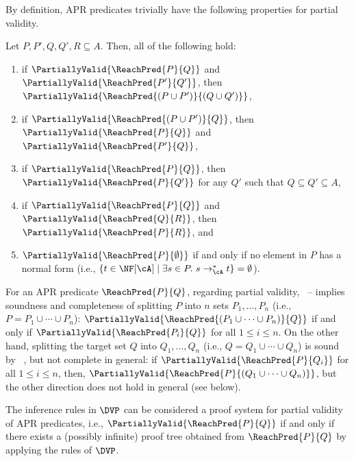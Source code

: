 By definition, APR predicates trivially have the following properties for partial validity.
\begin{proposition}
	\label{prop:basic-properties-of-partially-valid-APR-problems}
	Let $P,P',Q,Q',R \subseteq A$.
	Then, all of the following hold:
	\begin{enumerate}
		\renewcommand{\labelenumi}{(\arabic{enumi})}
		\leftskip=1ex
		\item if
		      $\PartiallyValid{\ReachPred{P}{Q}}$ and $\PartiallyValid{\ReachPred{P'}{Q'}}$,
		      then
		      $\PartiallyValid{\ReachPred{(P\cup P')}{(Q\cup Q')}}$,
		\item if
		      $\PartiallyValid{\ReachPred{(P\cup P')}{Q}}$,
		      then
		      $\PartiallyValid{\ReachPred{P}{Q}}$ and $\PartiallyValid{\ReachPred{P'}{Q}}$,
		\item if
		      $\PartiallyValid{\ReachPred{P}{Q}}$,
		      then
		      $\PartiallyValid{\ReachPred{P}{Q'}}$
		      for any $Q'$ such that $Q \subseteq Q' \subseteq A$,
		\item if
		      $\PartiallyValid{\ReachPred{P}{Q}}$ and $\PartiallyValid{\ReachPred{Q}{R}}$,
		      then
		      $\PartiallyValid{\ReachPred{P}{R}}$,
		      and
		\item $\PartiallyValid{\ReachPred{P}{\emptyset}}$
		      if and only if
		      no element in $P$ has a normal form (i.e., $\{ t \in \NF[\cA] \mid \exists s \in P.\ s \mathrel{\to_\cA^*} t \} = \emptyset$).

	\end{enumerate}
\end{proposition}


For an APR predicate $\ReachPred{P}{Q}$, regarding partial validity,
~-- implies
soundness and completeness of splitting $P$ into $n$ sets $P_1,\ldots,P_n$ (i.e., $P = P_1 \cup \cdots \cup P_n$):
$\PartiallyValid{\ReachPred{(P_1\cup\cdots\cup P_n)}{Q}}$
if and only if
$\PartiallyValid{\ReachPred{P_i}{Q}}$ for all $1 \leq i \leq n$.
On the other hand, splitting the target set $Q$ into $Q_1,\ldots,Q_n$ (i.e., $Q=Q_1\cup\cdots\cup Q_n$) is sound by ~, but not complete in general:
if
$\PartiallyValid{\ReachPred{P}{Q_i}}$ for all $1 \leq i \leq n$,
then,
$\PartiallyValid{\ReachPred{P}{(Q_1\cup\cdots\cup Q_n)}}$,
but
the other direction does not hold in general (see  below).


The inference rules in $\DVP$ can be considered a proof system for partial validity of APR predicates, i.e.,
$\PartiallyValid{\ReachPred{P}{Q}}$
if and only if there exists a (possibly infinite) proof tree obtained from $\ReachPred{P}{Q}$ by applying the rules of $\DVP$.

